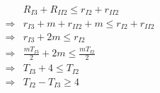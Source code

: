 \documentclass{article}
\begin{document}
\begin{multicols}{2}
  \begin{align*}
    & R_{I3} + R_{II2} \leq r_{I2} + r_{II2}\\
    \Rightarrow& r_{I3} + m + r_{II2} + m \leq r_{I2} + r_{II2}\\
    \Rightarrow& r_{I3} + 2m \leq r_{I2}\\
    \Rightarrow& \frac{mT_{I3}}{2} + 2m \leq \frac{mT_{I2}}{2}\\
    \Rightarrow& T_{I3} + 4 \leq T_{I2}\\
    \Rightarrow& T_{I2} - T_{I3} \geq 4\\
  \end{align*}
\end{multicols}

\hrulefill
\end{document}
